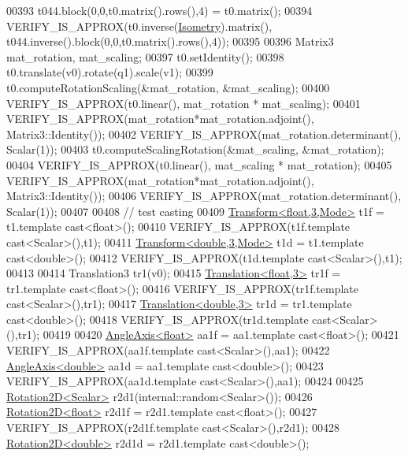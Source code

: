 \begin{DoxyCode}
00393   t044.block(0,0,t0.matrix().rows(),4) = t0.matrix();
00394   VERIFY\_IS\_APPROX(t0.inverse(\hyperlink{group__enums_ggaee59a86102f150923b0cac6d4ff05107a080cd5366173608f701cd945c2335568}{Isometry}).matrix(), t044.inverse().block(0,0,t0.matrix().rows(),4));
00395 
00396   Matrix3 mat\_rotation, mat\_scaling;
00397   t0.setIdentity();
00398   t0.translate(v0).rotate(q1).scale(v1);
00399   t0.computeRotationScaling(&mat\_rotation, &mat\_scaling);
00400   VERIFY\_IS\_APPROX(t0.linear(), mat\_rotation * mat\_scaling);
00401   VERIFY\_IS\_APPROX(mat\_rotation*mat\_rotation.adjoint(), Matrix3::Identity());
00402   VERIFY\_IS\_APPROX(mat\_rotation.determinant(), Scalar(1));
00403   t0.computeScalingRotation(&mat\_scaling, &mat\_rotation);
00404   VERIFY\_IS\_APPROX(t0.linear(), mat\_scaling * mat\_rotation);
00405   VERIFY\_IS\_APPROX(mat\_rotation*mat\_rotation.adjoint(), Matrix3::Identity());
00406   VERIFY\_IS\_APPROX(mat\_rotation.determinant(), Scalar(1));
00407 
00408   \textcolor{comment}{// test casting}
00409   \hyperlink{group___geometry___module_class_eigen_1_1_transform}{Transform<float,3,Mode>} t1f = t1.template cast<float>();
00410   VERIFY\_IS\_APPROX(t1f.template cast<Scalar>(),t1);
00411   \hyperlink{group___geometry___module_class_eigen_1_1_transform}{Transform<double,3,Mode>} t1d = t1.template cast<double>();
00412   VERIFY\_IS\_APPROX(t1d.template cast<Scalar>(),t1);
00413 
00414   Translation3 tr1(v0);
00415   \hyperlink{group___geometry___module_class_eigen_1_1_translation}{Translation<float,3>} tr1f = tr1.template cast<float>();
00416   VERIFY\_IS\_APPROX(tr1f.template cast<Scalar>(),tr1);
00417   \hyperlink{group___geometry___module_class_eigen_1_1_translation}{Translation<double,3>} tr1d = tr1.template cast<double>();
00418   VERIFY\_IS\_APPROX(tr1d.template cast<Scalar>(),tr1);
00419 
00420   \hyperlink{group___geometry___module_class_eigen_1_1_angle_axis}{AngleAxis<float>} aa1f = aa1.template cast<float>();
00421   VERIFY\_IS\_APPROX(aa1f.template cast<Scalar>(),aa1);
00422   \hyperlink{group___geometry___module_class_eigen_1_1_angle_axis}{AngleAxis<double>} aa1d = aa1.template cast<double>();
00423   VERIFY\_IS\_APPROX(aa1d.template cast<Scalar>(),aa1);
00424 
00425   \hyperlink{group___geometry___module_class_eigen_1_1_rotation2_d}{Rotation2D<Scalar>} r2d1(internal::random<Scalar>());
00426   \hyperlink{group___geometry___module_class_eigen_1_1_rotation2_d}{Rotation2D<float>} r2d1f = r2d1.template cast<float>();
00427   VERIFY\_IS\_APPROX(r2d1f.template cast<Scalar>(),r2d1);
00428   \hyperlink{group___geometry___module_class_eigen_1_1_rotation2_d}{Rotation2D<double>} r2d1d = r2d1.template cast<double>();

\end{DoxyCode}
